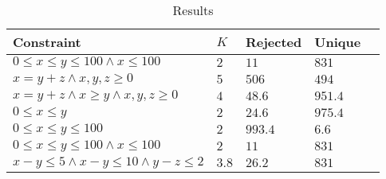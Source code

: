 \documentclass[10pt,a4paper]{article}
\begin{document}
\begin{center}
\begin{table}[]
\caption{Results}
\label{tab:data}
\centering
\begin{tabular}{|l|l|l|l|l|}
\hline
Constraint & $K$ & Rejected & Unique \\ \hline
     $0 \leq x \leq y \leq 100 \wedge x \leq 100$ & $2$ & $11$ & $831$ \\ \hline
     $x = y + z \wedge x,y,z \geq 0$      &   $5$   &    $506$      &     $494$   \\ \hline
     $x = y + z \wedge x \geq y \wedge x,y,z \geq 0$      &   $4$  &    $48.6$      &    $951.4$    \\ \hline
     $0 \leq x \leq y $  &  $2$   &  $24.6$   &       $975.4$       \\ \hline
     $0 \leq x \leq y \leq 100$ & $2$ & $993.4$ & $6.6$ \\ \hline
     $0 \leq x \leq y \leq 100 \wedge x \leq 100$ & $2$ & $11$ & $831$ \\ \hline
     $x - y \leq 5 \wedge x - y \leq 10 \wedge y - z \leq 2$ & $3.8$ & $26.2$ & $831$ \\ \hline
\end{tabular}
\end{table}
\end{center}



\end{document}
